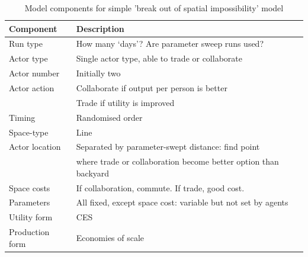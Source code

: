 \renewcommand{\arraystretch}{1.2}
\begin{table}[!hbt]
\begin{center}

\begin{tabular}{|l|l|}
\hline 
\textbf{Component} & \textbf{Description}\\
\hline
Run type & How many `days'? Are parameter sweep runs used?\\
\hline
Actor type & Single actor type, able to trade or collaborate\\
\hline
Actor number & Initially two\\
\hline
Actor action & Collaborate if output per person is better\\
& Trade if utility is improved\\
\hline
Timing &
Randomised order\\
\hline
Space-type &
Line\\
\hline
Actor location & Separated by parameter-swept distance: find point\\
&where trade or collaboration become better option than backyard\\
\hline
Space costs & If collaboration, commute. If trade, good cost.\\
\hline
Parameters & All fixed, except space cost: variable but not set by agents\\
\hline
Utility form & CES\\
\hline
Production form & Economies of scale\\
\hline

\end{tabular}

\caption{Model components for simple 'break out of spatial impossibility' model \label{tab:spatimpsimple}}
\end{center}
\end{table}